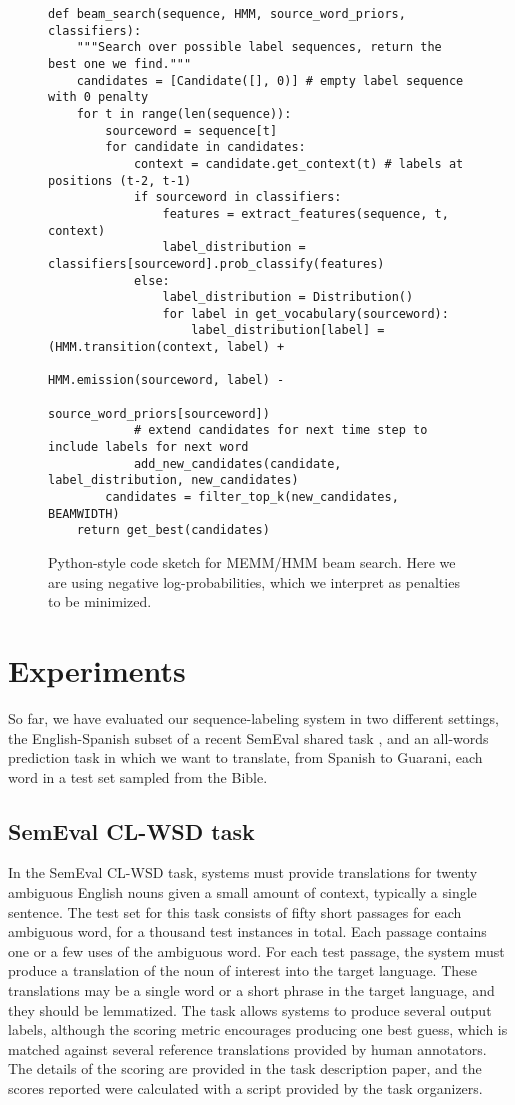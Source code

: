 \begin{figure*}
\begin{lstlisting}[frame=none]
def beam_search(sequence, HMM, source_word_priors, classifiers):
    """Search over possible label sequences, return the best one we find."""
    candidates = [Candidate([], 0)] # empty label sequence with 0 penalty
    for t in range(len(sequence)):
        sourceword = sequence[t]
        for candidate in candidates:
            context = candidate.get_context(t) # labels at positions (t-2, t-1)
            if sourceword in classifiers:
                features = extract_features(sequence, t, context)
                label_distribution = classifiers[sourceword].prob_classify(features)
            else:
                label_distribution = Distribution()
                for label in get_vocabulary(sourceword):
                    label_distribution[label] = (HMM.transition(context, label) +
                                                 HMM.emission(sourceword, label) -
                                                 source_word_priors[sourceword])
            # extend candidates for next time step to include labels for next word
            add_new_candidates(candidate, label_distribution, new_candidates)
        candidates = filter_top_k(new_candidates, BEAMWIDTH)
    return get_best(candidates)
\end{lstlisting}
\caption{Python-style code sketch for MEMM/HMM beam search. Here we are using
negative log-probabilities, which we interpret as penalties to be minimized.}
\label{fig:beamsearch}
\end{figure*}

\section{Experiments}
So far, we have evaluated our sequence-labeling system in two different
settings, the English-Spanish subset of a recent SemEval shared task
\cite{task10},
and an all-words prediction task in which we want to translate, from Spanish to
Guarani, each word in a test set sampled from the Bible.

\subsection{SemEval CL-WSD task}
In the SemEval CL-WSD task, systems must provide translations for twenty
ambiguous English nouns given a small amount of context, typically a single
sentence. The test set for this task consists of fifty short passages for each
ambiguous word, for a thousand test instances in total. Each passage contains one
or a few uses of the ambiguous word. For each test passage, the system must
produce a translation of the noun of interest into the target language.  These
translations may be a single word or a short phrase in the target language, and
they should be lemmatized. The task allows systems to produce several output
labels, although the scoring metric encourages producing one best guess, which
is matched against several reference translations provided by human annotators.
The details of the scoring are provided in the task description paper, and the
scores reported were calculated with a script provided by the task organizers.

